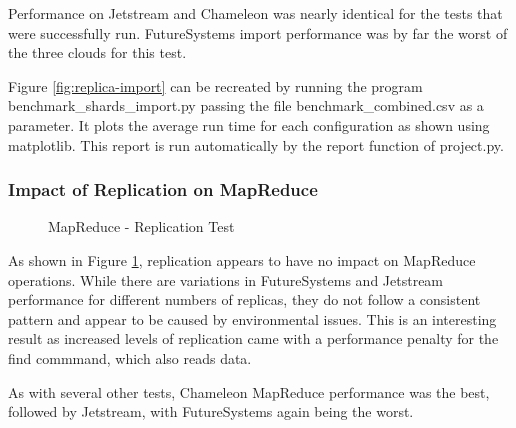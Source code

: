 \documentclass[9pt,twocolumn,twoside]{../../styles/osajnl}
\begin{document}
Performance on Jetstream and Chameleon was nearly identical for the tests that were successfully run.  FutureSystems import performance was by far the worst of the three clouds for this test.

Figure \ref{fig:replica-import} can be recreated by running the program benchmark\_shards\_import.py passing the file benchmark\_combined.csv as a parameter.  It plots the average run time for each configuration as shown using matplotlib.  This report is run automatically by the report function of project.py.

\subsubsection{Impact of Replication on MapReduce}

\begin{figure}[htbp]
\centering
{}
\caption{MapReduce - Replication Test}
\label{fig:replica-mapreduce}
\end{figure}

As shown in Figure \ref{fig:replica-mapreduce}, replication appears to have no impact on MapReduce operations.  While there are variations in FutureSystems and Jetstream performance for different numbers of replicas, they do not follow a consistent pattern and appear to be caused by environmental issues.  This is an interesting result as increased levels of replication came with a performance penalty for the find commmand, which also reads data.

As with several other tests, Chameleon MapReduce performance was the best, followed by Jetstream, with FutureSystems again being the worst.
\end{document}
